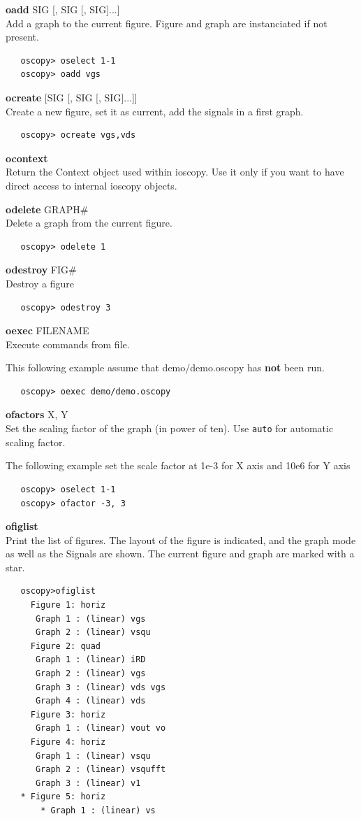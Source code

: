 \documentclass[a4paper,11pt]{article}
\begin{document}
\newcommand{\ocmd}[2]{{\large\vspace{5mm}\noindent\textbf{#1} #2\\}}

\ocmd{oadd}{SIG [, SIG [, SIG]...]}
   Add a graph to the current figure. Figure and graph are instanciated if not present.

\begin{verbatim}
   oscopy> oselect 1-1
   oscopy> oadd vgs
\end{verbatim}

\ocmd{ocreate}{[SIG [, SIG [, SIG]...]]}
   Create a new figure, set it as current, add the signals in a first graph.

\begin{verbatim}
   oscopy> ocreate vgs,vds
\end{verbatim}

\ocmd{ocontext}{\ }
   Return the Context object used within ioscopy. Use it only if you want to have direct access to internal ioscopy objects.

\ocmd{odelete}{GRAPH\#}
   Delete a graph from the current figure.

\begin{verbatim}
   oscopy> odelete 1
\end{verbatim}

\ocmd{odestroy}{FIG\#}
   Destroy a figure

\begin{verbatim}
   oscopy> odestroy 3
\end{verbatim}

\ocmd{oexec}{FILENAME}
   Execute commands from file.

   This following example assume that demo/demo.oscopy has \textbf{not} been run.

\begin{verbatim}
   oscopy> oexec demo/demo.oscopy
\end{verbatim}

\ocmd{ofactors}{X, Y}
   Set the scaling factor of the graph (in power of ten). Use \texttt{auto} for automatic scaling factor.

\noindent   The following example set the scale factor at 1e-3 for X axis and 10e6 for Y axis
\begin{verbatim}
   oscopy> oselect 1-1
   oscopy> ofactor -3, 3
\end{verbatim}

\ocmd{ofiglist}{\ }
   Print the list of figures. The layout of the figure is indicated, and the graph mode as well as the Signals are shown. The current figure and graph are marked with a star.
\begin{verbatim}
   oscopy>ofiglist
     Figure 1: horiz
      Graph 1 : (linear) vgs
      Graph 2 : (linear) vsqu
     Figure 2: quad
      Graph 1 : (linear) iRD
      Graph 2 : (linear) vgs
      Graph 3 : (linear) vds vgs
      Graph 4 : (linear) vds
     Figure 3: horiz
      Graph 1 : (linear) vout vo
     Figure 4: horiz
      Graph 1 : (linear) vsqu
      Graph 2 : (linear) vsqufft
      Graph 3 : (linear) v1
   * Figure 5: horiz
       * Graph 1 : (linear) vs
\end{verbatim}
\end{document}

